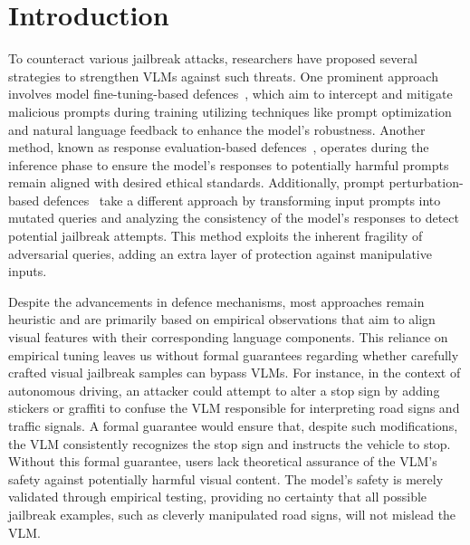 \section{Introduction}

To counteract various jailbreak attacks, researchers have proposed several strategies to strengthen VLMs against such threats. One prominent approach involves model fine-tuning-based defences~\citep{wang2024adashield,chen2024dressinstructinglargevisionlanguage}, which aim to intercept and mitigate malicious prompts during training utilizing techniques like prompt optimization and natural language feedback to enhance the model's robustness. Another method, known as response evaluation-based defences~\citep{pi2024mllmprotectorensuringmllmssafety,gou2024eyesclosedsafetyon}, operates during the inference phase to ensure the model's responses to potentially harmful prompts remain aligned with desired ethical standards.
Additionally, prompt perturbation-based defences~\citep {zhang2023mutation} take a different approach by transforming input prompts into mutated queries and analyzing the consistency of the model's responses to detect potential jailbreak attempts. This method exploits the inherent fragility of adversarial queries, adding an extra layer of protection against manipulative inputs.

Despite the advancements in defence mechanisms, most approaches remain heuristic and are primarily based on empirical observations that aim to align visual features with their corresponding language components. This reliance on empirical tuning leaves us without formal guarantees regarding whether carefully crafted visual jailbreak samples can bypass VLMs. 
{For instance, in the context of autonomous driving, an attacker could attempt to alter a stop sign by adding stickers or graffiti to confuse the VLM responsible for interpreting road signs and traffic signals. A formal guarantee would ensure that, despite such modifications, the VLM consistently recognizes the stop sign and instructs the vehicle to stop.}
{Without this formal guarantee, users lack theoretical assurance of the VLM's safety against potentially harmful visual content. The model's safety is merely validated through empirical testing, providing no certainty that all possible jailbreak examples, such as cleverly manipulated road signs, will not mislead the VLM.}

